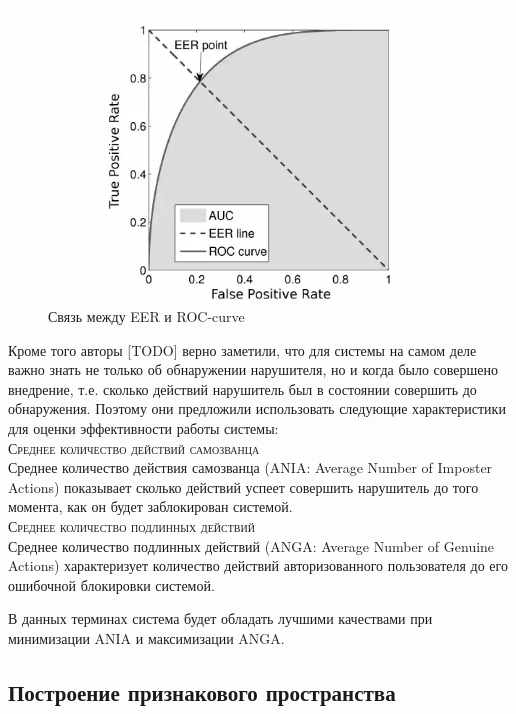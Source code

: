 \documentclass[12pt]{article}
\begin{document}
    \begin{figure}[hb]
        \centering
        \includegraphics[width=0.75\linewidth]{EER_ROC.png}
        \caption{Связь между EER и ROC-curve}
        \label{sec:Overview:Metrics:fig:EER_ROC}
    \end{figure}

    \par Кроме того авторы [TODO] верно заметили, что для системы на самом деле важно знать не только об обнаружении нарушителя, но и когда было совершено внедрение, т.е. сколько действий нарушитель был в состоянии совершить до обнаружения. Поэтому они предложили использовать следующие характеристики для оценки эффективности работы системы: \\

    \noindent\textsc{Среднее количество действий самозванца} \\
    Среднее количество действия самозванца (ANIA: Average Number of Imposter Actions) показывает сколько действий успеет совершить нарушитель до того момента, как он будет заблокирован системой. \\

    \noindent\textsc{Среднее количество подлинных действий} \\
    Среднее количество подлинных действий (ANGA: Average Number of Genuine Actions) характеризует количество действий авторизованного пользователя до его ошибочной блокировки системой. \\

    \par В данных терминах система будет обладать лучшими качествами при минимизации ANIA и максимизации ANGA.


    \subsection{Построение признакового пространства}
    \label{sec:Overview:Features}
\end{document}
